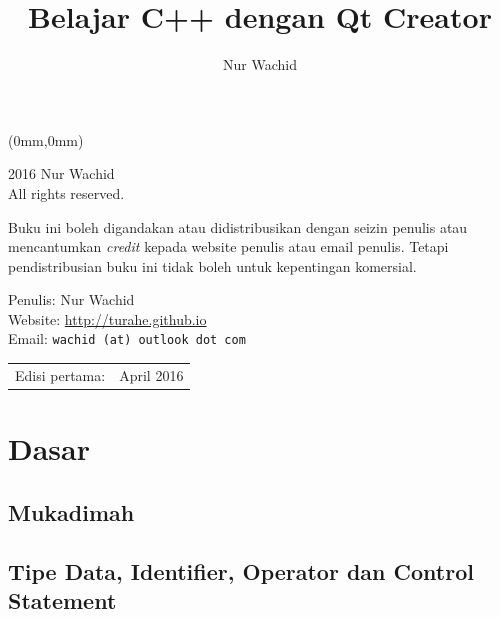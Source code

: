 \documentclass[11pt,b5paper,oneside,titlepage]{book}
\makeatletter
\renewcommand{\cleardoublepage}{
	\clearpage\ifodd\c@page\else
	\hbox{}
	\vspace*{\fill}
	\thispagestyle{empty}
	\newpage
	\fi}
\renewcommand{\cleardoublepage}{
	\clearpage\ifodd\c@page\else
	\hbox{}
	\vspace*{\fill}
	\thispagestyle{empty}
	\newpage
	\fi}
\makeatother
\begin{document}
	\begingroup
	\thispagestyle{empty}
	\begin{textblock*}{297mm}(0mm,0mm)
	\end{textblock*}
	\endgroup
	\cleardoublepage
	\frontmatter
	\author{Nur Wachid}
	\title{Belajar C++ dengan Qt Creator}
	\maketitle
	\begingroup
	\parskip \baselineskip
	\thispagestyle{empty}
	
	\textcopyright{} 2016 Nur Wachid \\
	All rights reserved.
	
	Buku ini boleh digandakan atau didistribusikan dengan
	seizin penulis atau mencantumkan \emph{credit} kepada
	website penulis atau email penulis. Tetapi pendistribusian
	buku ini tidak boleh untuk kepentingan komersial.
	
	Penulis: Nur Wachid \\
	Website: \url{http://turahe.github.io}  \\
	Email: \texttt{wachid  (at) outlook dot com} \\
	\phone 
	
	\begin{center}
		\begin{tabular}{ll}
			Edisi pertama:  & April 2016 \\
		\end{tabular}
	\end{center}
	
	\endgroup
	\tableofcontents
	\lstlistoflistings

	
	
	\clearpage
	\newpage

	
	\mainmatter
	
	\part{Dasar}
	\chapter{Mukadimah}\label{mukadimah}
	
	
	\chapter{Tipe Data, Identifier, Operator dan Control Statement}\label{tipe-data-identifier-operator-dan-control-statement}
	
	
\end{document}
